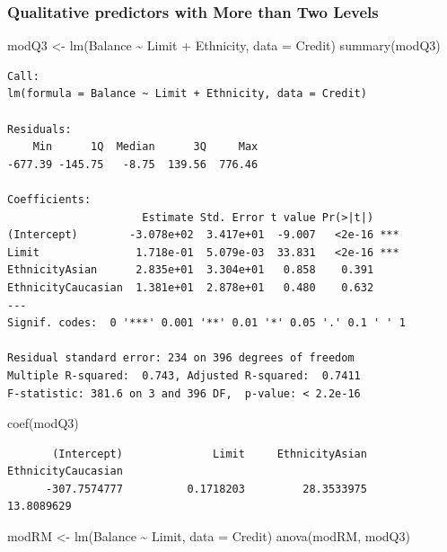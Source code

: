 \documentclass[
]{article}
\newenvironment{Shaded}{\begin{snugshade}}{\end{snugshade}}
\newcommand{\AttributeTok}[1]{\textcolor[rgb]{0.77,0.63,0.00}{#1}}
\newcommand{\FunctionTok}[1]{\textcolor[rgb]{0.00,0.00,0.00}{#1}}
\newcommand{\NormalTok}[1]{#1}
\newcommand{\OtherTok}[1]{\textcolor[rgb]{0.56,0.35,0.01}{#1}}
\newcommand{\SpecialCharTok}[1]{\textcolor[rgb]{0.00,0.00,0.00}{#1}}
\begin{document}
\hypertarget{qualitative-predictors-with-more-than-two-levels}{%
\subsubsection{Qualitative predictors with More than Two Levels}\label{qualitative-predictors-with-more-than-two-levels}}

\begin{Shaded}
\begin{Highlighting}[]
\NormalTok{modQ3 }\OtherTok{\textless{}{-}} \FunctionTok{lm}\NormalTok{(Balance }\SpecialCharTok{\textasciitilde{}}\NormalTok{ Limit }\SpecialCharTok{+}\NormalTok{ Ethnicity, }\AttributeTok{data =}\NormalTok{ Credit)}
\FunctionTok{summary}\NormalTok{(modQ3)}
\end{Highlighting}
\end{Shaded}

\begin{verbatim}
Call:
lm(formula = Balance ~ Limit + Ethnicity, data = Credit)

Residuals:
    Min      1Q  Median      3Q     Max 
-677.39 -145.75   -8.75  139.56  776.46 

Coefficients:
                     Estimate Std. Error t value Pr(>|t|)    
(Intercept)        -3.078e+02  3.417e+01  -9.007   <2e-16 ***
Limit               1.718e-01  5.079e-03  33.831   <2e-16 ***
EthnicityAsian      2.835e+01  3.304e+01   0.858    0.391    
EthnicityCaucasian  1.381e+01  2.878e+01   0.480    0.632    
---
Signif. codes:  0 '***' 0.001 '**' 0.01 '*' 0.05 '.' 0.1 ' ' 1

Residual standard error: 234 on 396 degrees of freedom
Multiple R-squared:  0.743, Adjusted R-squared:  0.7411 
F-statistic: 381.6 on 3 and 396 DF,  p-value: < 2.2e-16
\end{verbatim}

\begin{Shaded}
\begin{Highlighting}[]
\FunctionTok{coef}\NormalTok{(modQ3)}
\end{Highlighting}
\end{Shaded}

\begin{verbatim}
       (Intercept)              Limit     EthnicityAsian EthnicityCaucasian 
      -307.7574777          0.1718203         28.3533975         13.8089629 
\end{verbatim}

\begin{Shaded}
\begin{Highlighting}[]
\NormalTok{modRM }\OtherTok{\textless{}{-}} \FunctionTok{lm}\NormalTok{(Balance }\SpecialCharTok{\textasciitilde{}}\NormalTok{ Limit, }\AttributeTok{data =}\NormalTok{ Credit)}
\FunctionTok{anova}\NormalTok{(modRM, modQ3)}
\end{Highlighting}
\end{Shaded}
\end{document}
